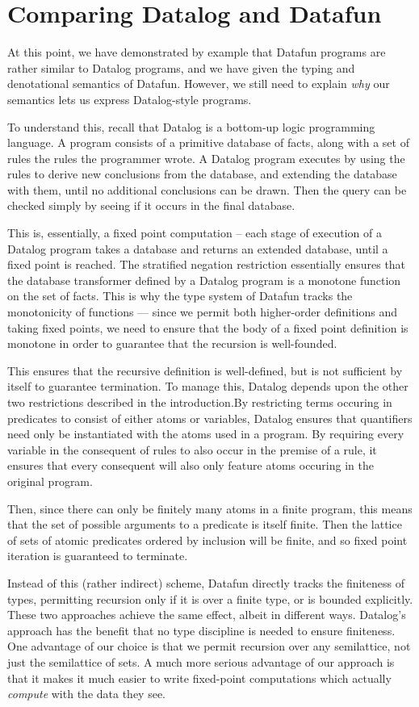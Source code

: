 \section{Comparing Datalog and Datafun}
\label{sec:datalog-vs-datafun}

At this point, we have
demonstrated by example that Datafun programs are rather similar to
Datalog programs, and we have given the typing and denotational
semantics of Datafun. However, we still need to explain \emph{why} our
semantics lets us express Datalog-style programs.

To understand this, recall that Datalog is a bottom-up logic
programming language. A program consists of a primitive database of
facts, along with a set of rules the rules the programmer wrote. A
Datalog program executes by using the rules to derive new conclusions
from the database, and extending the database with them, until no
additional conclusions can be drawn. Then the query can be checked
simply by seeing if it occurs in the final database.

This is, essentially, a fixed point computation -- each stage of
execution of a Datalog program takes a database and returns an
extended database, until a fixed point is reached. The stratified
negation restriction essentially ensures that the database transformer
defined by a Datalog program is a monotone function on the set of
facts. This is why the type system of Datafun tracks the monotonicity
of functions --- since we permit both higher-order definitions and
taking fixed points, we need to ensure that the body of a fixed point
definition is monotone in order to guarantee that the recursion is
well-founded.

This ensures that the recursive definition is well-defined, but is not
sufficient by itself to guarantee termination. To manage this, Datalog
depends upon the other two restrictions described in the
introduction.By restricting terms occuring in predicates to consist of
either atoms or variables, Datalog ensures that quantifiers need only
be instantiated with the atoms used in a program. By requiring every
variable in the consequent of rules to also occur in the premise of a
rule, it ensures that every consequent will also only feature atoms
occuring in the original program.

Then, since there can only be finitely many atoms in a finite program,
this means that the set of possible arguments to a predicate is itself
finite. Then the lattice of sets of atomic predicates ordered by
inclusion will be finite, and so fixed point iteration is guaranteed
to terminate.

Instead of this (rather indirect) scheme, Datafun directly tracks the
finiteness of types, permitting recursion only if it is over a finite
type, or is bounded explicitly. These two approaches achieve the same
effect, albeit in different ways. Datalog's approach has the benefit
that no type discipline is needed to ensure finiteness. One advantage
of our choice is that we permit recursion over any semilattice, not
just the semilattice of sets. A much more serious advantage of our
approach is that it makes it much easier to write fixed-point
computations which actually \emph{compute} with the data they see.
